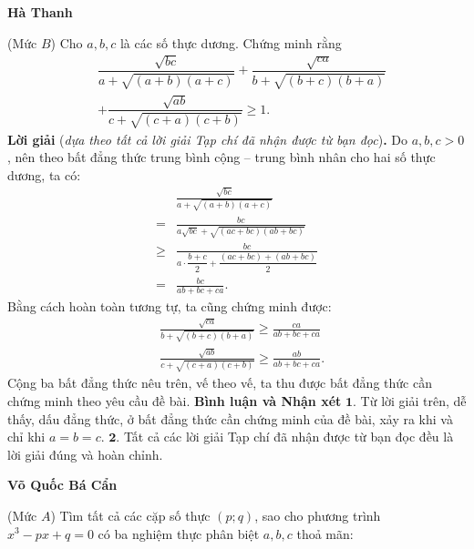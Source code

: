 \begin{multicols}{2}
	\begin{flushright}
		\textbf{\color{thachthuctoanhoc}Hà Thanh}
	\end{flushright}
	{\color{thachthuctoanhoc}{\usefont{T5}{qag}{b}{n} P686.}}
	(Mức $B$) Cho $a,b,c$ là các số thực dương. Chứng minh rằng
	\begin{align*}
		&\dfrac{\sqrt{b c}}{a\!+\!\sqrt{(a\!+\!b)(a\!+\!c)}}+\dfrac{\sqrt{c a}}{b+\sqrt{(b+c)(b+a)}}\\
		&+\dfrac{\sqrt{a b}}{c+\sqrt{(c+a)(c+b)}} \geq 1.
	\end{align*}
	\textbf{\color{thachthuctoanhoc}Lời giải} (\textit{dựa theo tất cả lời giải Tạp chí đã nhận được từ bạn đọc})\textbf{\color{thachthuctoanhoc}.}
	\vskip 0.05cm
	Do $a, b, c > 0$, nên theo bất đẳng thức trung bình cộng -- trung bình nhân cho hai số thực dương, ta có:
	\begin{align*}
			&\frac{{\sqrt {bc} }}{{a + \sqrt {\left( {a + b} \right)\left( {a + c} \right)} }} \\
			= &\frac{{bc}}{{a\sqrt {bc}  + \sqrt {\left( {ac + bc} \right)\left( {ab + bc} \right)} }}\\
			 \ge &\frac{{bc}}{{a \cdot \dfrac{{b + c}}{2} + \dfrac{{\left( {ac + bc} \right) + \left( {ab + bc} \right)}}{2}}}\\
			 = &\frac{{bc}}{{ab + bc + ca}}.
	\end{align*}
	Bằng cách hoàn toàn tương tự, ta cũng chứng minh được:
	\begin{align*}
		&\frac{{\sqrt {ca} }}{{b + \sqrt {\left( {b + c} \right)\left( {b + a} \right)} }} \ge \frac{{ca}}{{ab + bc + ca}}\\
		&\frac{{\sqrt {ab} }}{{c + \sqrt {\left( {c + a} \right)\left( {c + b} \right)} }} \ge \frac{{ab}}{{ab + bc + ca}}.
	\end{align*}
	Cộng ba bất đẳng thức nêu trên, vế theo vế, ta thu được bất đẳng thức cần chứng minh theo yêu cầu đề bài.
	\vskip 0.05cm
	\textbf{\color{thachthuctoanhoc}Bình luận và Nhận xét}
	\vskip 0.05cm
	$\pmb{1.}$ Từ lời giải trên, dễ thấy, dấu đẳng thức, ở bất đẳng thức cần chứng minh của đề bài, xảy ra khi và chỉ khi $a = b = c$.
	\vskip 0.05cm
	$\pmb{2.}$ Tất cả các lời giải Tạp chí đã nhận được từ bạn đọc đều là lời giải đúng và hoàn chỉnh.
	\begin{flushright}
		\textbf{\color{thachthuctoanhoc}Võ Quốc Bá Cẩn}
	\end{flushright}
	{}
	(Mức $A$) Tìm tất cả các cặp số thực $(p;q)$, sao cho phương trình $x^3-px+q=0$ có ba nghiệm thực phân biệt $a,b,c$  thoả mãn:

\end{multicols}
